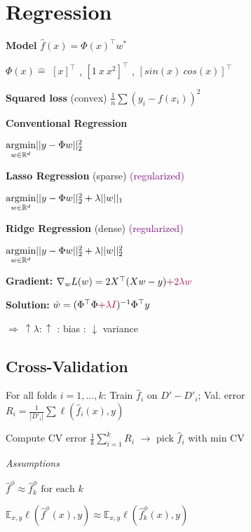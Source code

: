 \section*{Regression}

\textbf{Model} \quad $\hat{f}(x) = \Phi (x) ^\top w^*$

$\Phi (x) \hat{=}$   $[x] ^ \top$ , $[1~x~x^2] ^ \top$ , $[sin(x) ~ cos(x)] ^ \top$

\textbf{Squared loss} (convex) \quad  $\frac{1}{n}\sum (y_i - f(x_i))^2$

\vspace{3pt}

\textbf{Conventional Regression} 

\qquad \qquad $\underset{w \in \mathbb{R}^d}{\text{argmin}} ||y - \Phi w||_2^2$

\textbf{Lasso Regression} \quad (sparse)  \textcolor{purple}{(regularized)}

\qquad \qquad $\underset{w \in \mathbb{R}^d}{\text{argmin}} ||y - \Phi w||_2^2 + \lambda ||w||_1$

\textbf{Ridge Regression} \quad (dense) \textcolor{purple}{(regularized)}

\qquad \qquad $\underset{w \in \mathbb{R}^d}{\text{argmin}} ||y - \Phi w||_2^2 + \lambda ||w||_2^2$

\vspace{3pt}

\textbf{Gradient:} $\nabla_w L(w) = 2X^\top(Xw -y) \textcolor{purple}{+ 2 \lambda w}$

\textbf{Solution:} $\hat w = (\Phi^\top \Phi \textcolor{purple}{+ \lambda I})^{-1} \Phi^\top y$


$\Rightarrow ~ \uparrow \lambda : \uparrow$ : bias : $\downarrow$ variance  

\subsection*{Cross-Validation}

\begin{rowlist}
	\item For all folds $i = 1,..., k$:  Train $\hat{f}_i$ on $D' - D'_i$; Val. error $R_i = \frac{1}{|D'_i|} \sum \ell(\hat{f}_i(x), y)$
	\item Compute CV error $\frac{1}{k} \sum_{i=1}^k R_i$ $\rightarrow$ pick $\hat{f}_i$ with min CV
\end{rowlist}

\textit{Assumptions} \begin{rowlist}
    \item $ \hat{f}^{\phi}  \approx \hat{f}_{k}^{\phi} \text{ for each } k $
    \item $ \mathbb{E}_{x,y} \ell (\hat{f}^{\phi}(x), y) \approx \mathbb{E}_{x,y} \ell (\hat{f}_{k}^{\phi}(x), y) $
\end{rowlist}
